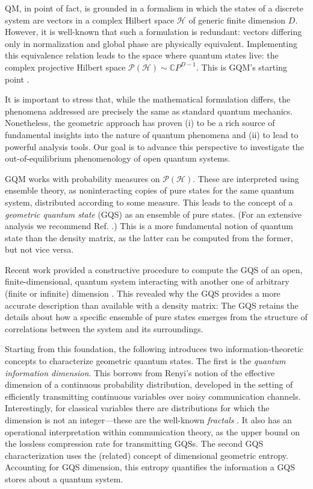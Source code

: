 \documentclass[draft,nofootinbib,pre,twocolumn,showkeys,superscriptaddress,preprintnumbers,floatfix]{revtex4-1}
\newcommand{\1}{\mathbbm{1}}
\newcommand{\PH}{\mathcal{P}(\mathcal{H})}
\begin{document}
QM, in point of fact, is grounded in a formalism in which the states of a
discrete system are vectors in a complex Hilbert space $\mathcal{H}$ of generic
finite dimension $D$. However, it is well-known that such a formulation is
redundant: vectors differing only in normalization and global phase are
physically equivalent. Implementing this equivalence relation leads to the
space where quantum states live: the complex projective Hilbert space $\PH \sim
\mathbb{C}P^{D-1}$. This is GQM's starting point 
\cite{STROCCHI1966,Miel68,Kibble1979,Heslot1985,Page87,And90,Gibbons1992,Ashtekar1995,Ashtekar1999,Brody2001,Carinena2007,Chruscinski2006,Marmo2010,Avron2020,Pastorello2015,Pastorello2015a,Pastorello2016,Clemente-Gallardo2013}.

It is important to stress that, while the mathematical formulation differs, the
phenomena addressed are precisely the same as standard quantum mechanics.
Nonetheless, the geometric approach has proven (i) to be a rich source of
fundamental insights into the nature of quantum phenomena and (ii) to lead to
powerful analysis tools. Our goal is to advance this perspective to investigate
the out-of-equilibrium phenomenology of open quantum systems.

GQM works with probability measures on $\PH$. These are interpreted using
ensemble theory, as noninteracting copies of pure states for the same quantum
system, distributed according to some measure. This leads to the concept of a
\emph{geometric quantum state} (GQS) as an ensemble of pure states. (For an
extensive analysis we recommend Ref. \cite{Brody2001}.) This is a more
fundamental notion of quantum state than the density matrix, as the latter can
be computed from the former, but not vice versa. 

Recent work provided a constructive procedure to compute the GQS of an open,
finite-dimensional, quantum system interacting with another one of arbitrary
(finite or infinite) dimension \cite{Anza20a}. This revealed why the GQS
provides a more accurate description than available with a density matrix: The
GQS retains the details about how a specific ensemble of pure states emerges
from the structure of correlations between the system and its surroundings. 

Starting from this foundation, the following introduces two
information-theoretic concepts to characterize geometric quantum states. The
first is the \emph{quantum information dimension}. This borrows from Renyi's notion of
the effective dimension of a continuous probability distribution, developed in
the setting of efficiently transmitting continuous variables over noisy
communication channels. Interestingly, for classical variables there are
distributions for which the dimension is not an integer---these are the well-known 
\emph{fractals} \cite{Feld12}. It also has an
operational interpretation within communication theory, as the upper bound
on the lossless compression rate for transmitting GQSs. The second GQS
characterization uses the (related) concept of dimensional geometric entropy.
Accounting for GQS dimension, this entropy quantifies the information a GQS
stores about a quantum system.
\end{document}
